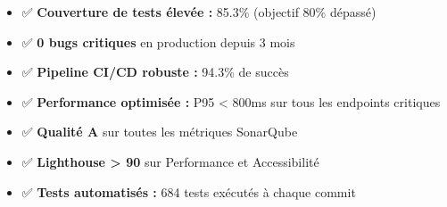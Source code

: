 \begin{tcolorbox}[colback=green!5!white,colframe=green!60!black,title=\textbf{Points forts de la stratégie qualité}]
\begin{itemize}
    \item ✅ \textbf{Couverture de tests élevée :} 85.3\% (objectif 80\% dépassé)
    \item ✅ \textbf{0 bugs critiques} en production depuis 3 mois
    \item ✅ \textbf{Pipeline CI/CD robuste :} 94.3\% de succès
    \item ✅ \textbf{Performance optimisée :} P95 < 800ms sur tous les endpoints critiques
    \item ✅ \textbf{Qualité A} sur toutes les métriques SonarQube
    \item ✅ \textbf{Lighthouse > 90} sur Performance et Accessibilité
    \item ✅ \textbf{Tests automatisés :} 684 tests exécutés à chaque commit
\end{itemize}
\end{tcolorbox}

